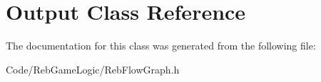 \hypertarget{class_output}{}\section{Output Class Reference}
\label{class_output}


The documentation for this class was generated from the following file\+:\begin{DoxyCompactItemize}
\item 
Code/\+Reb\+Game\+Logic/Reb\+Flow\+Graph.\+h\end{DoxyCompactItemize}
